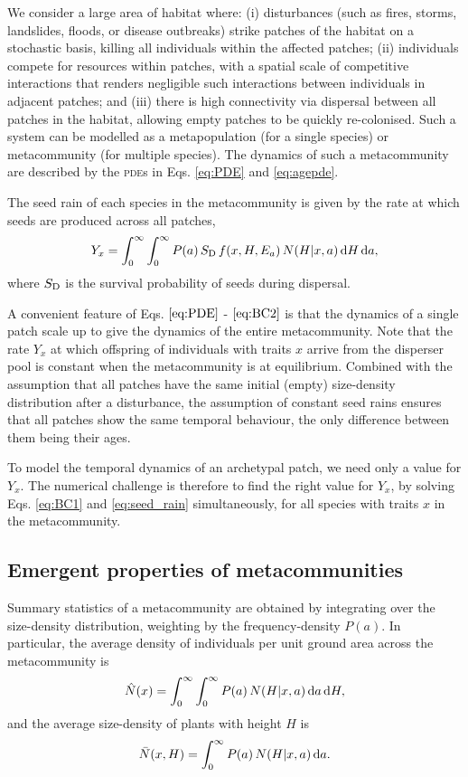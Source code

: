 \documentclass[10pt,twoside]{article}
\begin{document}
We consider a large area of habitat where: (i) disturbances (such as fires,
storms, landslides, floods, or disease outbreaks) strike patches of the
habitat on a stochastic basis, killing all individuals within the affected
patches; (ii) individuals compete for resources within patches, with a
spatial scale of competitive interactions that renders negligible such interactions between
individuals in adjacent patches; and (iii) there is high
connectivity via dispersal between all patches in the habitat, allowing
empty patches to be quickly re-colonised. Such a system can be modelled
as a metapopulation (for a single species) or metacommunity (for multiple
species). The dynamics of such a metacommunity are described by the
\textsc{pde}s in Eqs. \ref{eq:PDE} and \ref{eq:agepde}.

The seed rain of each species in the metacommunity is given by the rate at
which seeds are produced across all patches,
\begin{equation} \label{eq:seed_rain}
Y_x  = \int_0^{\infty} \int_0^{\infty} P(a) \, S_{\rm D} \, f(x, H, E_a) \, N(H | x, a) \, {\rm d} H \, {\rm d} a,
\end{equation}
where \(S_{\rm D}\) is the survival probability of seeds during dispersal.

A convenient feature of Eqs. \(\ref{eq:PDE}\) - \(\ref{eq:BC2}\) is that
the dynamics of a single patch scale up to give the dynamics of the
entire metacommunity. Note that the rate \(Y_x\) at which offspring of individuals with traits $x$ arrive from the
disperser pool is constant when the metacommunity is at
equilibrium. Combined with the assumption that all patches have the same
initial (empty) size-density distribution after a disturbance, the assumption of constant seed rains
ensures that all patches show the same temporal behaviour, the only
difference between them being their ages.

To model the temporal dynamics of an archetypal patch, we need only a
value for \(Y_x\). The numerical challenge is therefore to find the
right value for \(Y_x\), by solving Eqs. \ref{eq:BC1} and
\ref{eq:seed_rain} simultaneously, for all species with traits $x$ in the metacommunity.

\subsection{Emergent properties of
metacommunities}\label{emergent-properties-of-metapopulation}

Summary statistics of a metacommunity are obtained by integrating
over the size-density distribution, weighting by the frequency-density \(P(a)\).
In particular, the average density of individuals per unit ground area across the metacommunity is
\begin{equation}
\hat{N}(x) = \int_{0}^{\infty} \int_{0}^{\infty} P(a) \, N(H | x, a) \, {\rm d}a \, {\rm d}H,
\end{equation}
and the average size-density of plants with height \(H\) is
\begin{equation}
\bar{N}(x, H) = \int_{0}^{\infty}P(a) \, N(H | x, a) \, {\rm d}a.
\end{equation}
\end{document}

